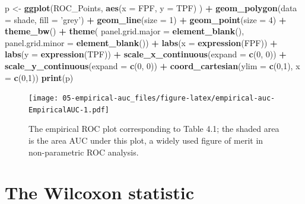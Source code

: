 \documentclass[
]{book}
\newenvironment{Shaded}{\begin{snugshade}}{\end{snugshade}}
\newcommand{\DataTypeTok}[1]{\textcolor[rgb]{0.13,0.29,0.53}{#1}}
\newcommand{\DecValTok}[1]{\textcolor[rgb]{0.00,0.00,0.81}{#1}}
\newcommand{\KeywordTok}[1]{\textcolor[rgb]{0.13,0.29,0.53}{\textbf{#1}}}
\newcommand{\NormalTok}[1]{#1}
\newcommand{\OperatorTok}[1]{\textcolor[rgb]{0.81,0.36,0.00}{\textbf{#1}}}
\newcommand{\StringTok}[1]{\textcolor[rgb]{0.31,0.60,0.02}{#1}}
\begin{document}
\begin{Shaded}
\begin{Highlighting}[]
\NormalTok{p <-}\StringTok{ }\KeywordTok{ggplot}\NormalTok{(ROC_Points, }
            \KeywordTok{aes}\NormalTok{(}\DataTypeTok{x =}\NormalTok{ FPF, }\DataTypeTok{y =}\NormalTok{ TPF) ) }\OperatorTok{+}\StringTok{ }
\StringTok{  }\KeywordTok{geom_polygon}\NormalTok{(}\DataTypeTok{data =}\NormalTok{ shade, }\DataTypeTok{fill =} \StringTok{'grey'}\NormalTok{) }\OperatorTok{+}\StringTok{ }
\StringTok{  }\KeywordTok{geom_line}\NormalTok{(}\DataTypeTok{size =} \DecValTok{1}\NormalTok{) }\OperatorTok{+}\StringTok{ }
\StringTok{  }\KeywordTok{geom_point}\NormalTok{(}\DataTypeTok{size =} \DecValTok{4}\NormalTok{) }\OperatorTok{+}\StringTok{ }
\StringTok{  }\KeywordTok{theme_bw}\NormalTok{() }\OperatorTok{+}\StringTok{ }
\StringTok{  }\KeywordTok{theme}\NormalTok{(}
    \DataTypeTok{panel.grid.major =} \KeywordTok{element_blank}\NormalTok{(), }
    \DataTypeTok{panel.grid.minor =} \KeywordTok{element_blank}\NormalTok{()) }\OperatorTok{+}
\StringTok{  }\KeywordTok{labs}\NormalTok{(}\DataTypeTok{x =} \KeywordTok{expression}\NormalTok{(FPF)) }\OperatorTok{+}\StringTok{ }
\StringTok{  }\KeywordTok{labs}\NormalTok{(}\DataTypeTok{y =} \KeywordTok{expression}\NormalTok{(TPF)) }\OperatorTok{+}\StringTok{ }
\StringTok{  }\KeywordTok{scale_x_continuous}\NormalTok{(}\DataTypeTok{expand =} \KeywordTok{c}\NormalTok{(}\DecValTok{0}\NormalTok{, }\DecValTok{0}\NormalTok{)) }\OperatorTok{+}\StringTok{ }
\StringTok{  }\KeywordTok{scale_y_continuous}\NormalTok{(}\DataTypeTok{expand =} \KeywordTok{c}\NormalTok{(}\DecValTok{0}\NormalTok{, }\DecValTok{0}\NormalTok{)) }\OperatorTok{+}\StringTok{ }
\StringTok{  }\KeywordTok{coord_cartesian}\NormalTok{(}\DataTypeTok{ylim =} \KeywordTok{c}\NormalTok{(}\DecValTok{0}\NormalTok{,}\DecValTok{1}\NormalTok{), }\DataTypeTok{x =} \KeywordTok{c}\NormalTok{(}\DecValTok{0}\NormalTok{,}\DecValTok{1}\NormalTok{))}
\KeywordTok{print}\NormalTok{(p)}
\end{Highlighting}
\end{Shaded}

\begin{figure}
\centering
\texttt{[image: 05-empirical-auc\_files/figure-latex/empirical-auc-EmpiricalAUC-1.pdf]}
\caption{\label{fig:empirical-auc-EmpiricalAUC}The empirical ROC plot corresponding to Table 4.1; the shaded area is the area AUC under this plot, a widely used figure of merit in non-parametric ROC analysis.}
\end{figure}

\hypertarget{empirical-auc-wilcoxon}{%
\section{The Wilcoxon statistic}\label{empirical-auc-wilcoxon}}
\end{document}
